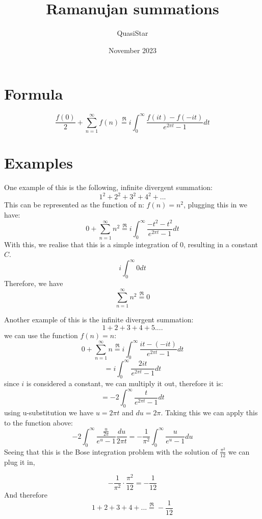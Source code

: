 \documentclass{article}
\title{Ramanujan summations}
\author{QuasiStar}
\date{November 2023}
\begin{document}
\maketitle
\section{Formula}

$$\frac{f\left(0\right)}{2}+\sum_{n=1}^{\infty}f\left(n\right) \stackrel{\mathbb{ℜ}}{=} i\int_{0}^{\infty}\frac{f\left(it\right)-f\left(-it\right)}{e^{2\pi t}-1}dt$$

\section{Examples}
One example of this is the following, infinite divergent summation:
$$1^{2}+2^{2}+3^{2}+4^{2}+...$$
This can be represented as the function of n: $f(n)=n^{2}$, plugging this in we have:
$$0+\sum_{n=1}^{\infty}n^{2} \stackrel{\mathbb{ℜ}}{=} i\int_{0}^{\infty}\frac{-t^{2}-t^{2}}{e^{2\pi t}-1}dt$$
With this, we realise that this is a simple integration of 0, resulting in a constant $C$.
$$i\int_{0}^{\infty}0dt$$
Therefore, we have 
$$\sum_{n=1}^{\infty}n^{2} \stackrel{\mathbb{ℜ}}{=} 0$$


Another example of this is the infinite divergent summation:
$$1+2+3+4+5....$$
we can use the function $f(n)=n$:
$$0+\sum_{n=1}^{\infty}n \stackrel{\mathbb{ℜ}}{=}  i\int_{0}^{\infty}\frac{it-(-it)}{e^{2\pi t}-1}dt$$
$$=  i\int_{0}^{\infty}\frac{2it}{e^{2\pi t}-1}dt$$
since $i$ is considered a constant, we can multiply it out, therefore it is:
$$=  -2\int_{0}^{\infty}\frac{t}{e^{2\pi t}-1}dt$$
using u-substitution we have $u=2\pi t$ and $du=2\pi$. Taking this we can apply this to the function above:
$$-2\int_{0}^{\infty}\frac{\frac{u}{2\pi}}{e^{u}-1}\frac{du}{2\pi t} = -\frac{1}{\pi^{2}}\int_{0}^{\infty}\frac{u}{e^{u}-1}du$$
Seeing that this is the Bose integration problem with the solution of $\frac{\pi^{2}}{12}$ we can plug it in,

$$-\frac{1}{\pi^{2}}\cdot\frac{\pi^{2}}{12}=-\frac{1}{12}$$
And therefore 
$$1+2+3+4+...\stackrel{\mathbb{ℜ}}{=} -\frac{1}{12}$$
\end{document}
